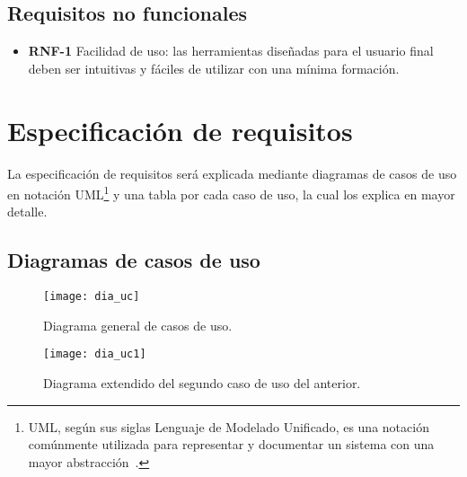 \subsection{Requisitos no funcionales}

\begin{itemize}
	\item \textbf{RNF-1} Facilidad de uso: las herramientas diseñadas para el usuario final deben ser intuitivas y fáciles de utilizar con una mínima formación.
\end{itemize}

\section{Especificación de requisitos}

La especificación de requisitos será explicada mediante diagramas de casos de uso en notación UML\footnote{UML, según sus siglas Lenguaje de Modelado Unificado, es una notación comúnmente utilizada para representar y documentar un sistema con una mayor abstracción~\cite{wiki:uml}.} y una tabla por cada caso de uso, la cual los explica en mayor detalle.

\subsection{Diagramas de casos de uso}

\begin{figure}
\centering
\texttt{[image: dia\_uc]}
\caption{Diagrama general de casos de uso.}
\label{fig:B.1}
\end{figure}

\begin{figure}
\centering
\texttt{[image: dia\_uc1]}
\caption[Diagrama extendido]{Diagrama extendido del segundo caso de uso del anterior.}
\label{fig:B.2}
\end{figure}




